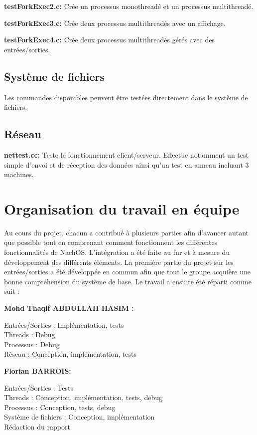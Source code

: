\documentclass[12pt]{report}
\begin{document}
\textbf{testForkExec2.c:} Crée un processus monothreadé et un processus multithreadé.
\bigskip

\textbf{testForkExec3.c:} Crée deux processus multithreadés avec un affichage.
\bigskip

\textbf{testForkExec4.c:} Crée deux processus multithreadés gérés avec des entrées/sorties.
\bigskip

\section{Système de fichiers}

Les commandes disponibles peuvent être testées directement dans le système de fichiers.


\section{Réseau}

\textbf{nettest.cc:} Teste le fonctionnement client/serveur. Effectue notamment un test simple d'envoi et de réception des données ainsi qu'un test en anneau incluant 3 machines.
\bigskip



\chapter{Organisation du travail en équipe}
Au cours du projet, chacun a contribué à plusieurs parties afin d'avancer autant que possible tout en comprenant
comment fonctionnent les différentes fonctionnalités de NachOS. L'intégration a été faite au fur et à mesure du développement des différents éléments. La première partie du projet sur les entrées/sorties a été développée en commun afin que tout le groupe acquière une bonne compréhension du système de base. Le travail a ensuite été réparti comme suit :
\bigskip


\textbf{Mohd Thaqif ABDULLAH HASIM :}

Entrées/Sorties : Implémentation, tests\\
Threads : Debug\\
Processus : Debug\\
Réseau : Conception, implémentation, tests
\bigskip 
 
\textbf{Florian BARROIS:}

Entrées/Sorties : Tests\\
Threads : Conception, implémentation, tests, debug\\
Processus : Conception, tests, debug\\
Système de fichiers : Conception, implémentation\\
Rédaction du rapport
\bigskip 
\end{document}
